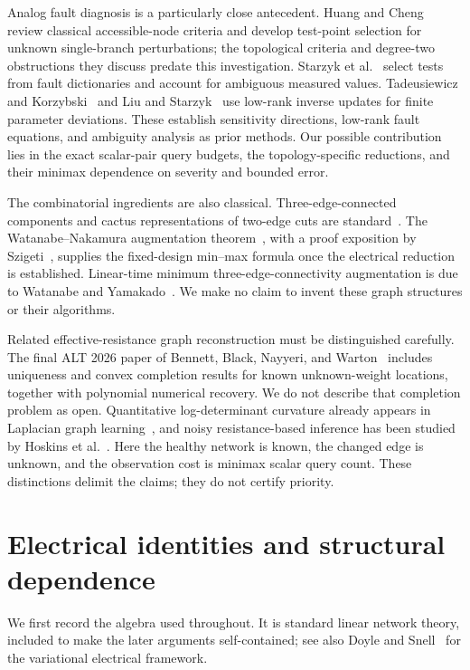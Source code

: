 \documentclass[11pt,letterpaper]{article}
\begin{document}
Analog fault diagnosis is a particularly close antecedent. Huang and Cheng~\cite{HC} review classical accessible-node criteria and develop test-point selection for unknown single-branch perturbations; the topological criteria and degree-two obstructions they discuss predate this investigation. Starzyk et al.~\cite{Starzyk} select tests from fault dictionaries and account for ambiguous measured values. Tadeusiewicz and Korzybski~\cite{TK} and Liu and Starzyk~\cite{LS} use low-rank inverse updates for finite parameter deviations. These establish sensitivity directions, low-rank fault equations, and ambiguity analysis as prior methods. Our possible contribution lies in the exact scalar-pair query budgets, the topology-specific reductions, and their minimax dependence on severity and bounded error.

The combinatorial ingredients are also classical. Three-edge-connected components and cactus representations of two-edge cuts are standard~\cite{MNS}. The Watanabe--Nakamura augmentation theorem~\cite{WN}, with a proof exposition by Szigeti~\cite{Szigeti}, supplies the fixed-design min--max formula once the electrical reduction is established. Linear-time minimum three-edge-connectivity augmentation is due to Watanabe and Yamakado~\cite{WY}. We make no claim to invent these graph structures or their algorithms.

Related effective-resistance graph reconstruction must be distinguished carefully. The final ALT 2026 paper of Bennett, Black, Nayyeri, and Warton~\cite{WBBN} includes uniqueness and convex completion results for known unknown-weight locations, together with polynomial numerical recovery. We do not describe that completion problem as open. Quantitative log-determinant curvature already appears in Laplacian graph learning~\cite{YCP}, and noisy resistance-based inference has been studied by Hoskins et al.~\cite{HMMT}. Here the healthy network is known, the changed edge is unknown, and the observation cost is minimax scalar query count. These distinctions delimit the claims; they do not certify priority.

\section{Electrical identities and structural dependence}
We first record the algebra used throughout. It is standard linear network theory, included to make the later arguments self-contained; see also Doyle and Snell~\cite{DS} for the variational electrical framework.
\end{document}
